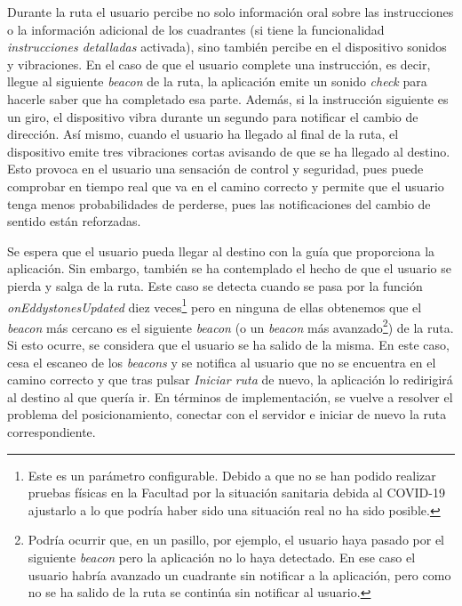\begin{itemize}
	Durante la ruta el usuario percibe no solo información oral sobre las instrucciones o la información adicional de los cuadrantes (si tiene la funcionalidad \textit{instrucciones detalladas} activada), sino también percibe en el dispositivo sonidos y vibraciones. En el caso de que el usuario complete una instrucción, es decir, llegue al siguiente \textit{beacon} de la ruta, la aplicación emite un sonido \textit{check} para hacerle saber que ha completado esa parte. Además, si la instrucción siguiente es un giro, el dispositivo vibra durante un segundo para notificar el cambio de dirección. Así mismo, cuando el usuario ha llegado al final de la ruta, el dispositivo emite tres vibraciones cortas avisando de que se ha llegado al destino. Esto provoca en el usuario una sensación de control y seguridad, pues puede comprobar en tiempo real que va en el camino correcto y permite que el usuario tenga menos probabilidades de perderse, pues las notificaciones del cambio de sentido están reforzadas.
	
	Se espera que el usuario pueda llegar al destino con la guía que proporciona la aplicación. Sin embargo, también se ha contemplado el hecho de que el usuario se pierda y salga de la ruta. Este caso se detecta cuando se pasa por la función \textit{onEddystonesUpdated} diez veces\footnote{Este es un parámetro configurable. Debido a que no se han podido realizar pruebas físicas en la Facultad por la situación sanitaria debida al COVID-19 ajustarlo a lo que podría haber sido una situación real no ha sido posible.} pero en ninguna de ellas obtenemos que el \textit{beacon} más cercano es el siguiente \textit{beacon} (o un \textit{beacon} más avanzado\footnote{Podría ocurrir que, en un pasillo, por ejemplo, el usuario haya pasado por el siguiente \textit{beacon} pero la aplicación no lo haya detectado. En ese caso el usuario habría avanzado un cuadrante sin notificar a la aplicación, pero como no se ha salido de la ruta se continúa sin notificar al usuario.}) de la ruta. Si esto ocurre, se considera que el usuario se ha salido de la misma. En este caso, cesa el escaneo de los \textit{beacons} y se notifica al usuario que no se encuentra en el camino correcto y que tras pulsar \textit{Iniciar ruta} de nuevo, la aplicación lo redirigirá al destino al que quería ir. En términos de implementación, se vuelve a resolver el problema del posicionamiento, conectar con el servidor e iniciar de nuevo la ruta correspondiente.
	
\end{itemize}


